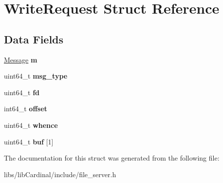 \hypertarget{structWriteRequest}{}\section{Write\+Request Struct Reference}
\label{structWriteRequest}
\subsection*{Data Fields}
\begin{DoxyCompactItemize}
\item 
\hyperlink{structMessage}{Message} {\bfseries m}\hypertarget{structWriteRequest_ab2d02d3abf521ee703500f0b6c7462ba}{}\label{structWriteRequest_ab2d02d3abf521ee703500f0b6c7462ba}

\item 
uint64\+\_\+t {\bfseries msg\+\_\+type}\hypertarget{structWriteRequest_a3e513746db1c28d523af4d8b7d5e11b3}{}\label{structWriteRequest_a3e513746db1c28d523af4d8b7d5e11b3}

\item 
uint64\+\_\+t {\bfseries fd}\hypertarget{structWriteRequest_a6406aead91fd9aaa26dd53bf2dc097e3}{}\label{structWriteRequest_a6406aead91fd9aaa26dd53bf2dc097e3}

\item 
int64\+\_\+t {\bfseries offset}\hypertarget{structWriteRequest_a4a2331e36353908d98d9aa9b96686afa}{}\label{structWriteRequest_a4a2331e36353908d98d9aa9b96686afa}

\item 
uint64\+\_\+t {\bfseries whence}\hypertarget{structWriteRequest_a73b0406aa1980d46143a36211233288a}{}\label{structWriteRequest_a73b0406aa1980d46143a36211233288a}

\item 
uint64\+\_\+t {\bfseries buf} \mbox{[}1\mbox{]}\hypertarget{structWriteRequest_a616d28a314dd5b655e55e1d1cdb0d166}{}\label{structWriteRequest_a616d28a314dd5b655e55e1d1cdb0d166}

\end{DoxyCompactItemize}


The documentation for this struct was generated from the following file\+:\begin{DoxyCompactItemize}
\item 
libs/lib\+Cardinal/include/file\+\_\+server.\+h\end{DoxyCompactItemize}
